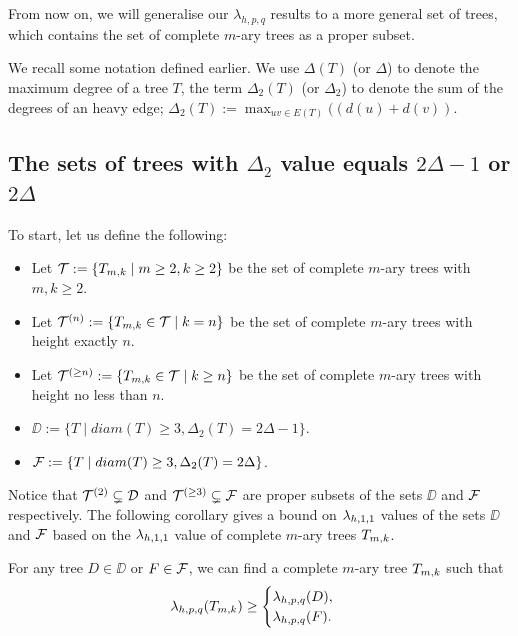 From now on, we will generalise our $\lambda_{h,p,q}$ results to a more general set of trees, which contains the set of complete $m$-ary trees as a proper subset. 

We recall some notation defined earlier. We use $\Delta(T)$ (or $\Delta$) to denote the maximum degree of a tree $T$, the term $\Delta_2(T)$ (or $\Delta_2$) to denote the sum of the degrees of an heavy edge; $\Delta_2(T) := \max_{uv \in E(T)}((d(u) + d(v))$.




\subsection{The sets of trees with $\Delta_2$ value equals $2\Delta-1$ or $2\Delta$}
\label{sec:general sets}

To start, let us define the following: 
\begin{itemize}
\item Let ${\cal T} := \{T_{m,k} \mid m \ge 2, k\ge 2\}$ be the set of complete $m$-ary trees with $m, k \ge 2$.
\item Let ${\cal T}^{(n)} := \{T_{m,k} \in {\cal T} \mid k=n\}$ be the set of complete $m$-ary trees with height exactly $n$. 
\item Let ${\cal T}^{(\ge n)} := \{T_{m,k} \in {\cal T} \mid k \ge n\}$ be the set of complete $m$-ary trees with height no less than $n$. 
\item $\DD := \{T \mid diam(T) \ge 3, \Delta_2(T) = 2\Delta-1 \}$. 
\item ${\cal F} := \{T \mid diam(T) \ge 3, \Delta_2(T) = 2\Delta\}$. 
\end{itemize}

Notice that ${\cal T}^{(2)} \subsetneq {\cal D}$ and ${\cal T}^{(\ge 3)} \subsetneq {\cal F}$ are proper subsets of the sets $\DD$ and ${\cal F}$ respectively. The following corollary gives a bound on $\lamh11$ values of the sets $\DD$ and ${\cal F}$ based on the $\lamh11$ value of complete $m$-ary trees $T_{m,k}$. 

\begin{corollary}
\label{cor:subtree}
For any tree $D \in \DD$ or $F \in {\cal F}$, we can find a complete $m$-ary tree $T_{m,k}$ such that 
\begin{align*}
\lambda_{h,p,q}(T_{m,k}) \ge
  \begin{cases}
   \lambda_{h,p,q}(D), \\
   \lambda_{h,p,q}(F).
  \end{cases}
 \end{align*}
 
 \end{corollary}
 
